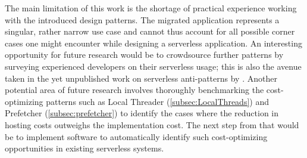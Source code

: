 The main limitation of this work is the shortage of practical experience working with the introduced design patterns. The migrated application represents a singular, rather narrow use case and cannot thus account for all possible corner cases one might encounter while designing a serverless application. An interesting opportunity for future research would be to crowdsource further patterns by surveying experienced developers on their serverless usage; this is also the avenue taken in the yet unpublished work on serverless anti-patterns by \textcite{taibi19antipatterns}. Another potential area of future research involves thoroughly benchmarking the cost-optimizing patterns such as Local Threader (\ref{subsec:LocalThreads}) and Prefetcher (\ref{subsec:prefetcher}) to identify the cases where the reduction in hosting costs outweighs the implementation cost. The next step from that would be to implement software to automatically identify such cost-optimizing opportunities in existing serverless systems.
